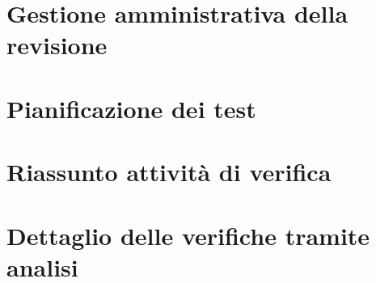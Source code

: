 \newpage
\section{Gestione amministrativa della revisione}


\newpage
\section{Pianificazione dei test}


\appendix

\newpage
\section{Riassunto attività di verifica}


\newpage
\section{Dettaglio delle verifiche tramite analisi}




